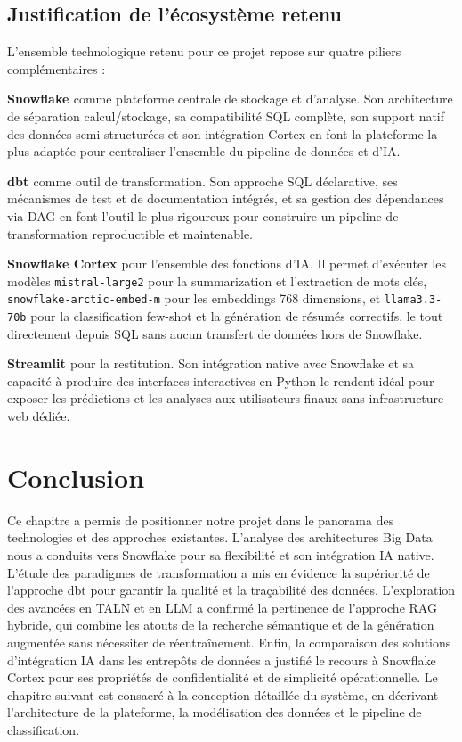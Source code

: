 \subsection{Justification de l'écosystème retenu}

L'ensemble technologique retenu pour ce projet repose sur quatre piliers complémentaires :

\textbf{Snowflake \cite{logo:snowflake}} comme plateforme centrale de stockage et d'analyse. Son architecture de séparation calcul/stockage, sa compatibilité SQL complète, son support natif des données semi-structurées et son intégration Cortex en font la plateforme la plus adaptée pour centraliser l'ensemble du pipeline de données et d'IA.

\textbf{dbt \cite{logo:dbt}} comme outil de transformation. Son approche SQL déclarative, ses mécanismes de test et de documentation intégrés, et sa gestion des dépendances via DAG en font l'outil le plus rigoureux pour construire un pipeline de transformation reproductible et maintenable.

\textbf{Snowflake Cortex \cite{logo:snowflake_cortex}} pour l'ensemble des fonctions d'IA. Il permet d'exécuter les modèles \texttt{mistral-large2} \cite{logo:mistral} pour la summarization et l'extraction de mots clés, \texttt{snowflake-arctic-embed-m} pour les embeddings 768 dimensions, et \texttt{llama3.3-70b} \cite{logo:llama} pour la classification few-shot et la génération de résumés correctifs, le tout directement depuis SQL sans aucun transfert de données hors de Snowflake.

\textbf{Streamlit \cite{logo:streamlit}} pour la restitution. Son intégration native avec Snowflake et sa capacité à produire des interfaces interactives en Python le rendent idéal pour exposer les prédictions et les analyses aux utilisateurs finaux sans infrastructure web dédiée.

\section{Conclusion}

Ce chapitre a permis de positionner notre projet dans le panorama des technologies et des approches existantes. L'analyse des architectures Big Data nous a conduits vers Snowflake \cite{logo:snowflake} pour sa flexibilité et son intégration IA native. L'étude des paradigmes de transformation a mis en évidence la supériorité de l'approche dbt \cite{logo:dbt} pour garantir la qualité et la traçabilité des données. L'exploration des avancées en TALN et en LLM \cite{logo:transformer, logo:bert, logo:rag} a confirmé la pertinence de l'approche RAG hybride, qui combine les atouts de la recherche sémantique et de la génération augmentée sans nécessiter de réentraînement. Enfin, la comparaison des solutions d'intégration IA dans les entrepôts de données a justifié le recours à Snowflake Cortex \cite{logo:snowflake_cortex} pour ses propriétés de confidentialité et de simplicité opérationnelle. Le chapitre suivant est consacré à la conception détaillée du système, en décrivant l'architecture de la plateforme, la modélisation des données et le pipeline de classification.
